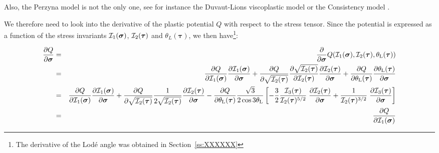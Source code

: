 Also, the Perzyna model is not the only one, see for instance
the Duvaut-Lions viscoplastic model or the Consistency model \cite{wasd97,hesd02}.






We therefore need to look into the derivative of the plastic potential $Q$
with respect to the stress tensor. Since the potential 
is expressed as a function of the stress invariants ${\cal I}_1(\bm\sigma)$,
${\cal I}_2(\bm\tau)$ and $\theta_L(\bm\tau)$, we then have\footnote{
The derivative of the Lod\'e angle was obtained in Section~\ref{ss:XXXXXX}}:

\begin{eqnarray}
\frac{\partial Q}{\partial \bm\sigma}
&=&
\frac{\partial }{\partial \bm\sigma} Q({\cal I}_1(\bm\sigma),{\cal I}_2(\bm\tau),\theta_{\rm L}(\bm\tau))\nn\\
&=&
\frac{\partial Q}{\partial {\cal I}_1(\bm\sigma)} 
\frac{\partial {\cal I}_1(\bm\sigma)}{\partial \bm\sigma} 
+
\frac{\partial Q}{\partial \sqrt{{\cal I}_2(\bm\tau)}} 
\frac{\partial \sqrt{ {\cal I}_2(\bm\tau)}   }{\partial {\cal I}_2(\bm\tau)} 
\frac{\partial {\cal I}_2(\bm\tau)}{\partial \bm\sigma} 
+
\frac{\partial Q}{\partial \theta_{\rm L}(\bm\tau)} 
\frac{\partial \theta_{\rm L}(\bm\tau)}{\partial \bm\sigma} \nn\\
&=&
\frac{\partial Q}{\partial {\cal I}_1(\bm\sigma)} 
\frac{\partial {\cal I}_1(\bm\sigma)}{\partial \bm\sigma} 
+
\frac{\partial Q}{\partial \sqrt{{\cal I}_2(\bm\tau)}} 
\frac{1}{2 \sqrt{ {\cal I}_2(\bm\tau)}   }
\frac{\partial {\cal I}_2(\bm\tau)}{\partial \bm\sigma} 
-
\frac{\partial Q}{\partial \theta_{\rm L}(\bm\tau)} 
\frac{\sqrt{3}}{2\cos 3\theta_{\rm L}}
\left[
-\frac32  \frac{ {\cal I}_3(\bm\tau)   }{ {\cal I}_2(\bm\tau)^{5/2}}
\; \frac{\partial {\cal I}_2(\bm\tau)}{\partial \bm\sigma} 
+  \frac{1}{{\cal I}_2(\bm\tau)^{3/2}} 
\; \frac{\partial {\cal I}_3(\bm\tau)}{\partial \bm\sigma} 
\right] \nn\\
&=&
\frac{\partial Q}{\partial {\cal I}_1(\bm\sigma)} 

\end{eqnarray}
